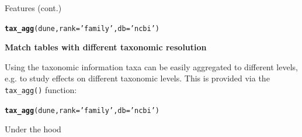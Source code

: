 \documentclass[final,t]{beamer}\usepackage[]{graphicx}\usepackage[]{color}
\makeatletter
\newcommand{\hlstr}[1]{\textcolor[rgb]{0.192,0.494,0.8}{#1}}%
\newcommand{\hlstd}[1]{\textcolor[rgb]{0.345,0.345,0.345}{#1}}%
\newcommand{\hlkwc}[1]{\textcolor[rgb]{0.333,0.667,0.333}{#1}}%
\newcommand{\hlkwd}[1]{\textcolor[rgb]{0.737,0.353,0.396}{\textbf{#1}}}%
\newenvironment{kframe}{%
 \def\at@end@of@kframe{}%
 \ifinner\ifhmode%
  \def\at@end@of@kframe{\end{minipage}}%
  \begin{minipage}{\columnwidth}%
 \fi\fi%
 \def\FrameCommand##1{\hskip\@totalleftmargin \hskip-\fboxsep
 \colorbox{shadecolor}{##1}\hskip-\fboxsep
     \hskip-\linewidth \hskip-\@totalleftmargin \hskip\columnwidth}%
 \MakeFramed {\advance\hsize-\width
   \@totalleftmargin\z@ \linewidth\hsize
   \@setminipage}}%
 {\par\unskip\endMakeFramed%
 \at@end@of@kframe}
\newenvironment{knitrout}{}{} %
\renewenvironment{knitrout}{}{\vspace{-1.8em}}
\makeatother
\begin{document}
\begin{frame}[fragile]
\begin{columns}[t]
\begin{column}{.49\linewidth}
\begin{block}{Features (cont.)}
\begin{knitrout}\footnotesize
{}\color{fgcolor}\begin{kframe}
\begin{alltt}
\hlkwd{tax_agg}\hlstd{(dune,} \hlkwc{rank} \hlstd{=} \hlstr{'family'}\hlstd{,} \hlkwc{db} \hlstd{=} \hlstr{'ncbi'}\hlstd{)}
\end{alltt}
\end{kframe}
\end{knitrout}
\vspace{2em}

\textcolor{i6bluedark}{\textbf{\large Match tables with different taxonomic resolution}}
        \vspace{0.5em}
        \par
        \begingroup
        \leftskip=2cm
        \noindent 
          Using the taxonomic information taxa can be easily aggregated to different levels, e.g. to study effects on different taxonomic levels.
          This is provided via the \texttt{tax\_agg()} function:
        \par
        \endgroup

\begin{knitrout}\footnotesize
{}\color{fgcolor}\begin{kframe}
\begin{alltt}
\hlkwd{tax_agg}\hlstd{(dune,} \hlkwc{rank} \hlstd{=} \hlstr{'family'}\hlstd{,} \hlkwc{db} \hlstd{=} \hlstr{'ncbi'}\hlstd{)}
\end{alltt}
\end{kframe}
\end{knitrout}
\vspace{2em}
      \end{block}
      
      \begin{block}{Under the hood}
      
      \end{block}
      

\end{column}
\end{columns}
\end{frame}
\end{document}
